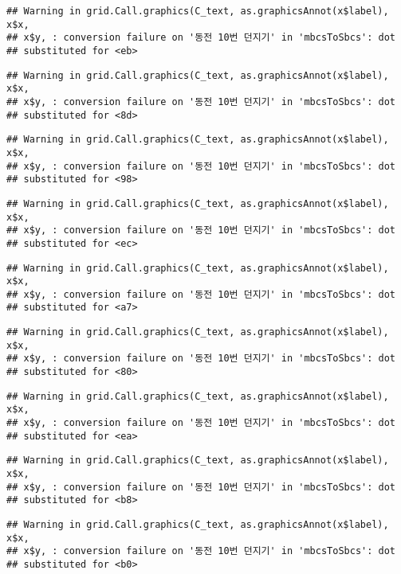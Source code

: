 \documentclass[]{book}
\begin{document}
\begin{verbatim}
## Warning in grid.Call.graphics(C_text, as.graphicsAnnot(x$label), x$x,
## x$y, : conversion failure on '동전 10번 던지기' in 'mbcsToSbcs': dot
## substituted for <eb>
\end{verbatim}

\begin{verbatim}
## Warning in grid.Call.graphics(C_text, as.graphicsAnnot(x$label), x$x,
## x$y, : conversion failure on '동전 10번 던지기' in 'mbcsToSbcs': dot
## substituted for <8d>
\end{verbatim}

\begin{verbatim}
## Warning in grid.Call.graphics(C_text, as.graphicsAnnot(x$label), x$x,
## x$y, : conversion failure on '동전 10번 던지기' in 'mbcsToSbcs': dot
## substituted for <98>
\end{verbatim}

\begin{verbatim}
## Warning in grid.Call.graphics(C_text, as.graphicsAnnot(x$label), x$x,
## x$y, : conversion failure on '동전 10번 던지기' in 'mbcsToSbcs': dot
## substituted for <ec>
\end{verbatim}

\begin{verbatim}
## Warning in grid.Call.graphics(C_text, as.graphicsAnnot(x$label), x$x,
## x$y, : conversion failure on '동전 10번 던지기' in 'mbcsToSbcs': dot
## substituted for <a7>
\end{verbatim}

\begin{verbatim}
## Warning in grid.Call.graphics(C_text, as.graphicsAnnot(x$label), x$x,
## x$y, : conversion failure on '동전 10번 던지기' in 'mbcsToSbcs': dot
## substituted for <80>
\end{verbatim}

\begin{verbatim}
## Warning in grid.Call.graphics(C_text, as.graphicsAnnot(x$label), x$x,
## x$y, : conversion failure on '동전 10번 던지기' in 'mbcsToSbcs': dot
## substituted for <ea>
\end{verbatim}

\begin{verbatim}
## Warning in grid.Call.graphics(C_text, as.graphicsAnnot(x$label), x$x,
## x$y, : conversion failure on '동전 10번 던지기' in 'mbcsToSbcs': dot
## substituted for <b8>
\end{verbatim}

\begin{verbatim}
## Warning in grid.Call.graphics(C_text, as.graphicsAnnot(x$label), x$x,
## x$y, : conversion failure on '동전 10번 던지기' in 'mbcsToSbcs': dot
## substituted for <b0>
\end{verbatim}
\end{document}
